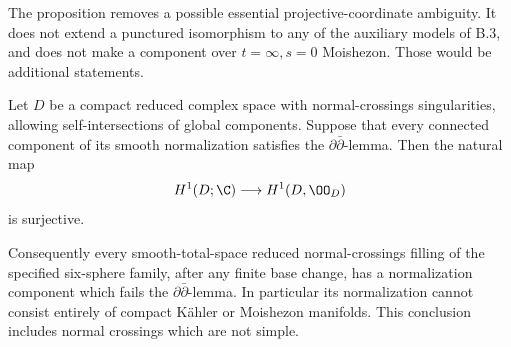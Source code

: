 The proposition removes a possible essential projective-coordinate
ambiguity. It does not extend a punctured isomorphism to any of
the auxiliary models of B.3, and does not make a component over
$t=\infty,s=0$ Moishezon. Those would be additional statements.

\begin{theorem}\label{push:src:B.4.5}
Let $D$ be a compact reduced complex space with normal-crossings
singularities, allowing self-intersections of global components.
Suppose that every connected component of its smooth normalization
satisfies the $\partial\bar\partial$-lemma. Then the natural map
\[
 H^1(D;\C)\longrightarrow H^1(D,\OO_D)
\]
is surjective.

Consequently every smooth-total-space reduced normal-crossings
filling of the specified six-sphere family, after any finite base
change, has a normalization component which fails the
$\partial\bar\partial$-lemma. In particular its normalization
cannot consist entirely of compact K\"ahler or Moishezon manifolds.
This conclusion includes normal crossings which are not simple.
\end{theorem}

